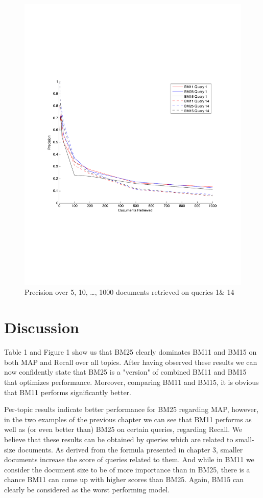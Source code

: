 \documentclass[letterpaper,11pt]{article}
\begin{document}
\begin{figure}[h]
\centering
\includegraphics[scale = 0.75]{dr2.pdf}
\caption{Precision over 5, 10, \dots, 1000 documents retrieved on queries 1\& 14}

\end{figure}

\newpage

\section{Discussion}
Table 1 and Figure 1 show us that BM25 clearly dominates BM11 and BM15 on both MAP and Recall over all topics. After having observed these results we can now confidently state that BM25 is a "version" of combined BM11 and BM15 that optimizes performance. Moreover, comparing BM11 and BM15, it is obvious that BM11 performs significantly better. 

Per-topic results indicate better performance for BM25 regarding MAP, however, in the two examples of the previous chapter we can see that BM11 performs as well as (or even better than) BM25 on certain queries, regarding Recall. We believe that these results can be obtained by queries which are related to small-size documents. As derived from the formula presented in chapter 3, smaller documents increase the score of queries related to them. And while in BM11 we consider the document size to be of more importance than in BM25, there is a chance BM11 can come up with higher scores than BM25. Again, BM15 can clearly be considered as the worst performing model.
\end{document}
